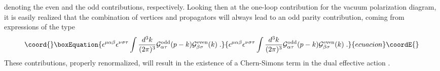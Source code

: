 \documentclass[a4paper,12pt]{article}
\begin{document}
\coordHE{}
denoting the even and the odd contributions, respectively. Looking
then at the one-loop contribution for the vacuum polarization diagram,
it is easily realized that the combination of vertices and propagators
will always lead to an odd parity contribution, coming from
expressions of the type
\begin{equation}\coord{}\boxEquation{
\epsilon ^{\mu \alpha \beta }\epsilon ^{\nu \sigma \tau }\int \frac{
d^3k}{(2\pi )^3}{\cal G}_{\alpha \tau }^{{\rm odd}}(p-k){\cal G}_{\beta
\sigma }^{{\rm even}}(k)\;.  \label{pol}
}{
\epsilon ^{\mu \alpha \beta }\epsilon ^{\nu \sigma \tau }\int \frac{
d^3k}{(2\pi )^3}{\cal G}_{\alpha \tau }^{{\rm odd}}(p-k){\cal G}_{\beta
\sigma }^{{\rm even}}(k)\;.  }{ecuacion}\coordE{}\end{equation}
These contributions, properly renormalized, will result in the
existence of a Chern-Simons term in the dual effective action
\coordHE{}.
\end{document}
